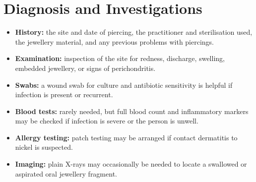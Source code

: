 \section*{Diagnosis and Investigations}
\begin{itemize}
    \item \textbf{History:} the site and date of piercing, the practitioner and sterilisation used, the jewellery material, and any previous problems with piercings.
    \item \textbf{Examination:} inspection of the site for redness, discharge, swelling, embedded jewellery, or signs of perichondritis.
    \item \textbf{Swabs:} a wound swab for culture and antibiotic sensitivity is helpful if infection is present or recurrent.
    \item \textbf{Blood tests:} rarely needed, but full blood count and inflammatory markers may be checked if infection is severe or the person is unwell.
    \item \textbf{Allergy testing:} patch testing may be arranged if contact dermatitis to nickel is suspected.
    \item \textbf{Imaging:} plain X-rays may occasionally be needed to locate a swallowed or aspirated oral jewellery fragment.
\end{itemize}

